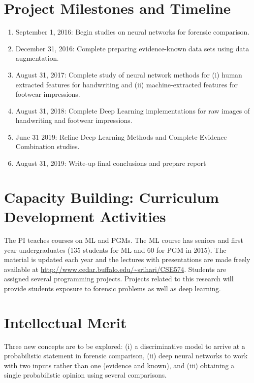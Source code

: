\documentclass[11pt, doublespacing]{article}
\begin{document}
\section{Project Milestones and Timeline}
\label{Timeline}
 
\begin{enumerate}
\item{September 1, 2016: 	Begin studies on neural networks for forensic comparison.}
\item{December 31, 2016:  Complete  preparing evidence-known data sets using data augmentation.}
\item{August 31, 2017:  Complete study of neural network methods for (i) human extracted features for handwriting and (ii) machine-extracted features for footwear impressions.}
\item{August 31, 2018: Complete Deep Learning implementations for raw images of handwriting and footwear impressions.}
\item{June 31  2019:  Refine Deep Learning Methods and Complete Evidence Combination studies.}
\item{August 31, 2019: Write-up final conclusions and prepare report}
\end{enumerate}



\section{Capacity Building: Curriculum Development Activities}

The PI teaches courses on ML and PGMs. The ML course has seniors and first year undergraduates (135 students for ML  and 60  for PGM in 2015). The material is  updated each year and the lectures with presentations  are made freely available at \url{http://www.cedar.buffalo.edu/~srihari/CSE574}.  Students are assigned several programming projects.  
Projects related to this research will provide students  exposure to forensic  problems as well as deep learning. 


\section{Intellectual Merit}
Three new concepts are to be explored: (i)  a  discriminative model  to arrive at a probabilistic statement in forensic comparison,  (ii) deep neural networks to work with two inputs rather than one (evidence and known), and (iii) obtaining a single probabilistic opinion using several comparisons. 
\end{document}
